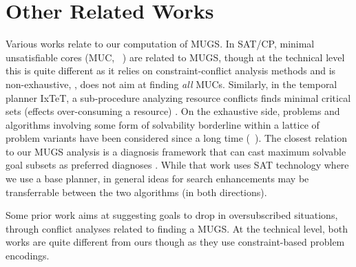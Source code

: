 \section{Other Related Works}
\label{related}



Various works relate to our computation of MUGS. In SAT/CP, minimal
unsatisfiable cores (MUC, \eg\ \cite{chinneck:2007,laborie:ecai-14})
are related to MUGS, though at the technical level this is quite
different as it relies on constraint-conflict analysis methods and is
non-exhaustive, \ie, does not aim at finding \emph{all}
MUCs. Similarly, in the temporal planner IxTeT, a sub-procedure
analyzing resource conflicts finds minimal critical sets (effects
over-consuming a resource) \cite{laborie:ghallab:ijcai-95}. On the
exhaustive side, problems and algorithms involving some form of
solvability borderline within a lattice of problem variants have been
considered since a long time
(\eg\ \cite{dekleer:ai-86:atms,reiter:ai-87}). The closest relation to
our MUGS analysis is a diagnosis framework that can cast maximum
solvable goal subsets as preferred diagnoses
\cite{grastien:etal:kr-12}. While that work uses SAT technology where
we use a base planner, in general ideas for search enhancements may be
transferrable between the two algorithms (in both directions).

Some prior work \cite{yu:etal:jair-17,lauffer:topcu:xaip-19} aims at
suggesting goals to drop in oversubscribed situations, through
conflict analyses related to finding a MUGS. At the technical level,
both works are quite different from ours though as they use
constraint-based problem encodings.

